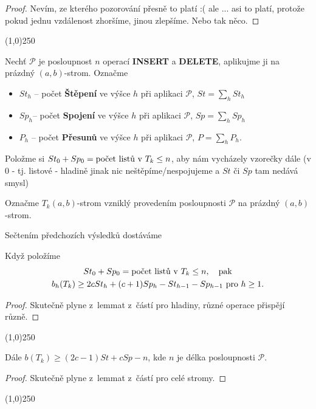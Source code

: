 \documentclass[a4paper,12pt]{article}
\newenvironment{pitemize}{
 \begin{itemize}
   \setlength{\itemsep}{1pt}
   \setlength{\parskip}{0pt}
   \setlength{\parsep}{0pt}
 }{\end{itemize}}
\newenvironment{myproof}{
  \begin{proof}
    
  }{
  \end{proof}
  \begin{center}
   \line(1,0){250}
   \end{center}
  }
\begin{document}
\begin{myproof}
    Nevím, ze kterého pozorování přesně to platí :( ale ... asi to platí, protože pokud jednu vzdálenost zhoršíme, jinou zlepšíme. Nebo tak něco.
\end{myproof}

\begin{definice}
    Nechť $\mathcal P$ je 
    posloupnost $n$ operací {\bf INSERT} a {\bf DELETE}, aplikujme ji na 
    prázdný $(a,b)$-strom. Označme
    \begin{pitemize} 
    \item $St_h$ -- počet {\bf Štěpení} ve výšce $h$ při aplikaci $
    \mathcal P$, $St=\sum_hSt_h$ 
    \item $Sp_h$-- počet {\bf Spojení} ve výšce $h$ při aplikaci $
    \mathcal P$, 
    $Sp=\sum_hSp_h$
    \item $P_h$ -- počet {\bf Přesunů} ve výšce $h$ při aplikaci $
    \mathcal P$, 
    $P=\sum_hP_h$.
    \end{pitemize}
\end{definice}

\begin{definice}
    Položme si  $St_0+Sp_0=\text{\rm počet listů v }T_k\le n$, aby nám vycházely vzorečky dále (v 0 - tj. listové - hladině jinak nic neštěpíme/nespojujeme a $St$ či $Sp$ tam nedává smysl)
\end{definice}


\begin{definice}Označme $T_k(a,b)$-strom vzniklý provedením posloupnosti 
$\mathcal P$ na prázdný $(a,b)$-strom.
\end{definice}

 Sečtením předchozích 
výsledků dostá\-váme

\begin{dusledek_counting}Když položíme 
\begin{gather*} St_0+Sp_0=\text{\rm počet listů v }T_k\le n
,\quad\text{\rm pak}\\
b_h(T_k)\ge 2cSt_h+(c+1)Sp_h-St_{h-1}-Sp_{h-1}\text{\rm\ pro }h\ge 
1.\end{gather*}
\end{dusledek_counting}
\begin{myproof}
    Skutečně plyne z~lemmat z~částí pro hladiny, různé operace přispějí různě.
\end{myproof}

\begin{dusledek_counting}
Dále $b(T_k)\ge (2c-1)St+cSp-n$, kde $n$ je délka posloupnosti $
\mathcal P$.
\end{dusledek_counting}
\begin{myproof}
    Skutečně plyne z~lemmat z~částí pro celé stromy.
    
    
\end{myproof}
\end{document}
